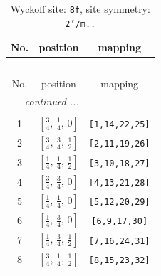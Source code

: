 \documentclass[fleqn,8pt]{jsarticle}
\begin{document}
\begin{longtable}{ccc}
\caption{Wyckoff site: {\tt 8f}, site symmetry: {\tt 2'/m..}}
 \\
 \hline \hline
No. & position & mapping \\ \hline \endfirsthead

\multicolumn{2}{l}{\tablename\ \thetable{}} \\
 \hline \hline
No. & position & mapping \\ \hline \endhead

 \hline \hline
\multicolumn{2}{r}{\footnotesize\it continued ...} \\ \endfoot

 \hline \hline
\multicolumn{2}{r}{} \\ \endlastfoot

1 & $\left[ \frac{3}{4},\, \frac{1}{4},\, 0 \right]$ & {\tt [1,14,22,25]} \\ \hline
2 & $\left[ \frac{3}{4},\, \frac{3}{4},\, \frac{1}{2} \right]$ & {\tt [2,11,19,26]} \\ \hline
3 & $\left[ \frac{1}{4},\, \frac{1}{4},\, \frac{1}{2} \right]$ & {\tt [3,10,18,27]} \\ \hline
4 & $\left[ \frac{3}{4},\, \frac{3}{4},\, 0 \right]$ & {\tt [4,13,21,28]} \\ \hline
5 & $\left[ \frac{1}{4},\, \frac{1}{4},\, 0 \right]$ & {\tt [5,12,20,29]} \\ \hline
6 & $\left[ \frac{1}{4},\, \frac{3}{4},\, 0 \right]$ & {\tt [6,9,17,30]} \\ \hline
7 & $\left[ \frac{1}{4},\, \frac{3}{4},\, \frac{1}{2} \right]$ & {\tt [7,16,24,31]} \\ \hline
8 & $\left[ \frac{3}{4},\, \frac{1}{4},\, \frac{1}{2} \right]$ & {\tt [8,15,23,32]} \\
\end{longtable}
\renewcommand{\arraystretch}{1.2}
\end{document}
